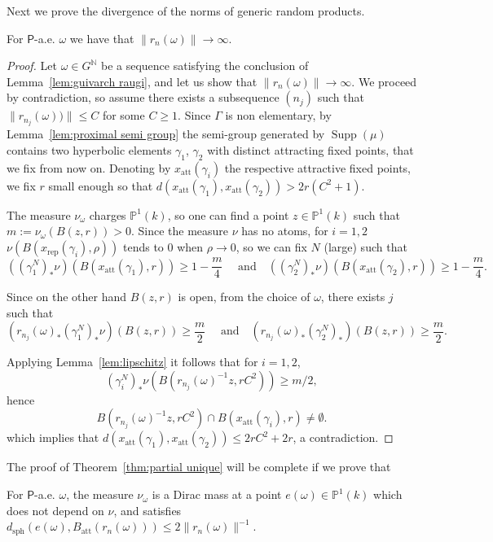 \documentclass[AHL,Unicode,longabstracts]{cedram}
\DeclareMathOperator{\supp}{Supp}
\DeclareMathOperator{\sph}{sph}
\newcommand{\nn}{\mathbb{N}}
\newcommand{\prob}{\mathsf{P}}
\newcommand{\cv}{\rightarrow}
\newcommand{\PP}{\mathbb{P}}
\newcommand{\lrpar}[1]{\left(#1\right)}
\newcommand{\att}{\mathrm{att}}
\newcommand{\rep}{\mathrm{rep}}
\begin{document}
Next we prove the divergence of the norms of generic random products.

\begin{lemm}\label{lem:contraction}
For $\prob$-a.e. $\omega$ we have that $\| r_n(\omega)\| \cv\infty$.
\end{lemm}

\begin{proof}
Let $\omega \in G^\nn$ be a sequence satisfying the conclusion of Lemma~\ref{lem:guivarch raugi}, and let us show that $\| r_n(\omega)\| \cv\infty$. We proceed by contradiction, so assume there exists a subsequence $(n_j)$ such that $\|r_{n_j}(\omega))\|\leq C$ for some $C\geq 1$. Since $\Gamma$ is non elementary, by Lemma~\ref{lem:proximal semi group} the semi-group generated by $\supp(\mu)$ contains two hyperbolic elements $\gamma_1$, $\gamma_2$ with distinct attracting fixed points, that we fix from now on. Denoting by $x_{\att}(\gamma_i)$ the respective attractive fixed points, we fix $r$ small enough so that $d(x_\att(\gamma_1),x_\att(\gamma_2)) > 2r (C^2+1)$.

The measure $\nu_\omega$ charges $\PP^1(k)$, so one can find a point $z\in \PP^1(k)$ such that $m := \nu_\omega(B(z,r))>0$. Since the measure $\nu$ has no atoms, for $i=1, 2$ $ \nu(B(x_\rep(\gamma_i),\rho))$ tends to $0$ when $\rho\to0$, so we can fix $N$ (large) such that
\[
((\gamma_1^N)_*\nu) (B(x_\att(\gamma_1),r)) \geq 1- \frac{m}{4} \quad\text{ and}\quad ((\gamma_2^{N})_*\nu)(B(x_\att(\gamma_2),r)) \geq 1- \frac{m}{4}.
\]

Since on the other hand $B(z,r)$ is open, from the choice of $\omega$, there exists $j$ such that
\[
\lrpar{ r_{n_j}(\omega)_* (\gamma_1^N)_*\nu} (B(z,r)) \geq \frac{m}{2}
\quad\text{ and}\quad \lrpar{ r_{n_j}(\omega)_*(\gamma_2^{N})_*} (B(z,r)) \geq \frac{m}{2}.
\]

Applying Lemma~\ref{lem:lipschitz} it follows that for $i=1,2$,
\[
(\gamma_i^N)_*\nu(B(r_{n_j}(\omega)^{-1}z, rC^2))\geq m/2,
\]
hence
\[
B(r_{n_j}(\omega)^{-1}z, rC^2)\cap B(x_\att(\gamma_i),r) \neq \emptyset.
\]
which implies that $d(x_\att(\gamma_1), x_\att(\gamma_2)) \le 2rC^2 + 2r$, a contradiction.
\end{proof}

The proof of Theorem~\ref{thm:partial unique} will be complete if we prove that

\begin{lemm}\label{lem:Dirac}
For $\prob$-a.e. $\omega$, the measure $\nu_\omega$ is a Dirac mass at a point $e(\omega)\in \PP^1(k)$ which does not depend on $\nu$, and satisfies $d_{\sph}(e(\omega), B_\att(r_n(\omega))) \le 2\|r_n(\omega)\|^{-1}$.
\end{lemm}
\end{document}
